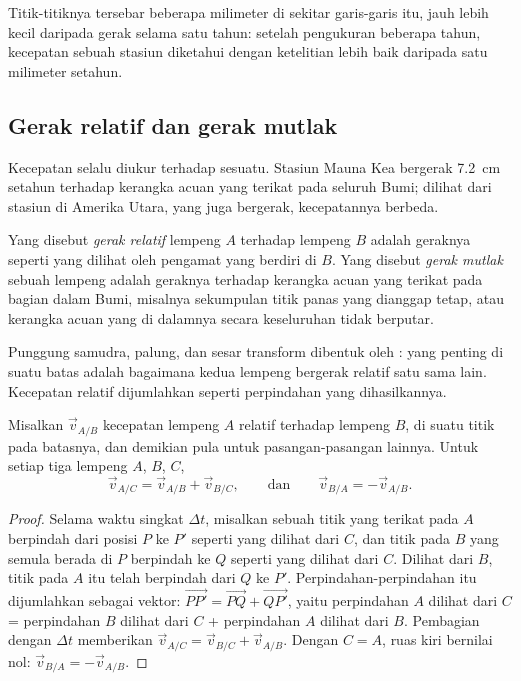 Titik-titiknya tersebar beberapa milimeter di sekitar garis-garis itu, jauh
lebih kecil daripada gerak selama satu tahun: setelah pengukuran beberapa tahun,
kecepatan sebuah stasiun diketahui dengan ketelitian lebih baik daripada satu
milimeter setahun.

\subsection{Gerak relatif dan gerak mutlak}

Kecepatan selalu diukur terhadap sesuatu. Stasiun Mauna Kea bergerak
\qty{7.2}{cm} setahun terhadap kerangka acuan yang terikat pada seluruh Bumi;
dilihat dari stasiun di Amerika Utara, yang juga bergerak, kecepatannya berbeda.

\begin{definition}\label{def:g11:plate-motions:relative-motion}
Yang disebut \emph{gerak relatif} lempeng $A$ terhadap
lempeng $B$ adalah geraknya seperti yang dilihat oleh pengamat yang berdiri di
$B$. Yang disebut \emph{gerak mutlak} sebuah lempeng adalah
geraknya terhadap kerangka acuan yang terikat pada bagian dalam Bumi, misalnya
sekumpulan titik panas yang dianggap tetap, atau kerangka acuan yang di dalamnya
 secara keseluruhan tidak berputar.
\end{definition}

Punggung samudra, palung, dan sesar transform dibentuk oleh : yang
penting di suatu batas adalah bagaimana kedua lempeng bergerak relatif satu sama
lain. Kecepatan relatif dijumlahkan seperti perpindahan yang dihasilkannya.

\begin{proposition}\label{prop:g11:plate-motions:sum}
Misalkan $\vec v_{A/B}$ kecepatan lempeng $A$ relatif terhadap lempeng $B$, di
suatu titik pada batasnya, dan demikian pula untuk pasangan-pasangan lainnya.
Untuk setiap tiga lempeng $A$, $B$, $C$,
\[
  \vec v_{A/C} = \vec v_{A/B} + \vec v_{B/C},
  \qquad\text{dan}\qquad
  \vec v_{B/A} = -\vec v_{A/B}.
\]
\end{proposition}

\begin{proof}
Selama waktu singkat $\Delta t$, misalkan sebuah titik yang terikat pada $A$
berpindah dari posisi $P$ ke $P'$ seperti yang dilihat dari $C$, dan titik pada
$B$ yang semula berada di $P$ berpindah ke $Q$ seperti yang dilihat dari $C$.
Dilihat dari $B$, titik pada $A$ itu telah berpindah dari $Q$ ke
$P'$. Perpindahan-perpindahan itu dijumlahkan sebagai vektor:
$\overrightarrow{PP'} = \overrightarrow{PQ} + \overrightarrow{QP'}$, yaitu
perpindahan $A$ dilihat dari $C$ = perpindahan $B$ dilihat dari $C$ +
perpindahan $A$ dilihat dari $B$. Pembagian dengan $\Delta t$ memberikan $\vec v_{A/C}
= \vec v_{B/C} + \vec v_{A/B}$. Dengan $C = A$, ruas kiri bernilai nol: $\vec
v_{B/A} = -\vec v_{A/B}$.
\end{proof}

